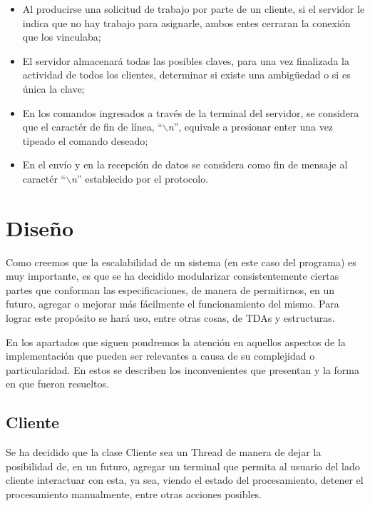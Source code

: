 \documentclass{article}
\begin{document}
\begin{itemize}
	\itemsep=3pt \topsep=0pt \partopsep=0pt \parskip=0pt \parsep=0pt

	\item Al producirse una solicitud de trabajo por parte de un cliente, si el servidor le indica que no hay trabajo para asignarle, ambos entes cerraran la conexión que los vinculaba;

	\item El servidor almacenará todas las posibles claves, para una vez finalizada la actividad de todos los clientes, determinar si existe una ambig\"uedad o si es única la clave;

	\item En los comandos ingresados a través de la terminal del servidor, se considera que el caractér de fin de línea, ``\textit{$\backslash$n}'', equivale a presionar enter una vez tipeado el comando deseado;

	\item En el envío y en la recepción de datos se considera como fin de mensaje al caractér ``\textit{$\backslash$n}'' establecido por el protocolo.
\end{itemize}
\medskip




\section{Diseño}

	Como creemos que la escalabilidad de un sistema (en este caso del programa) es muy importante, es que se ha decidido modularizar consistentemente ciertas partes que conforman las especificaciones, de manera de permitirnos, en un futuro, agregar o mejorar más fácilmente el funcionamiento del mismo. Para lograr este propósito se hará uso, entre otras cosas, de TDAs y estructuras.
	\par
	En los apartados que siguen pondremos la atención en aquellos aspectos de la implementación que pueden ser relevantes a causa de su complejidad o particularidad. En estos se describen los inconvenientes que presentan y la forma en que fueron resueltos.
\bigskip



\subsection{Cliente}
	
	Se ha decidido que la clase Cliente sea un Thread de manera de dejar la posibilidad de, en un futuro, agregar un terminal que permita al usuario del lado cliente interactuar con esta, ya sea, viendo el estado del procesamiento, detener el procesamiento manualmente, entre otras acciones posibles.
	\bigskip	
\end{document}
